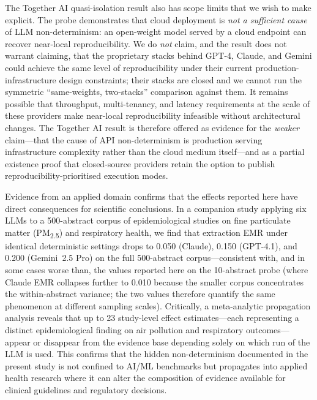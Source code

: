 \documentclass[sn-nature]{sn-jnl}
\begin{document}
The Together AI quasi-isolation result also has scope limits that we wish to make explicit.
The probe demonstrates that cloud deployment is \emph{not a sufficient cause} of LLM non-determinism: an open-weight model served by a cloud endpoint can recover near-local reproducibility.
We do \emph{not} claim, and the result does not warrant claiming, that the proprietary stacks behind GPT-4, Claude, and Gemini could achieve the same level of reproducibility under their current production-infrastructure design constraints; their stacks are closed and we cannot run the symmetric ``same-weights, two-stacks'' comparison against them.
It remains possible that throughput, multi-tenancy, and latency requirements at the scale of these providers make near-local reproducibility infeasible without architectural changes.
The Together AI result is therefore offered as evidence for the \emph{weaker} claim---that the cause of API non-determinism is production serving infrastructure complexity rather than the cloud medium itself---and as a partial existence proof that closed-source providers retain the option to publish reproducibility-prioritised execution modes.

Evidence from an applied domain confirms that the effects reported here have direct consequences for scientific conclusions.
In a companion study applying six LLMs to a 500-abstract corpus of epidemiological studies on fine particulate matter (PM\textsubscript{2.5}) and respiratory health\cite{rover2026evidence}, we find that extraction EMR under identical deterministic settings drops to 0.050 (Claude), 0.150 (GPT-4.1), and 0.200 (Gemini~2.5 Pro) on the full 500-abstract corpus---consistent with, and in some cases worse than, the values reported here on the 10-abstract probe (where Claude EMR collapses further to 0.010 because the smaller corpus concentrates the within-abstract variance; the two values therefore quantify the same phenomenon at different sampling scales).
Critically, a meta-analytic propagation analysis reveals that up to 23 study-level effect estimates---each representing a distinct epidemiological finding on air pollution and respiratory outcomes---appear or disappear from the evidence base depending solely on which run of the LLM is used.
This confirms that the hidden non-determinism documented in the present study is not confined to AI/ML benchmarks but propagates into applied health research where it can alter the composition of evidence available for clinical guidelines and regulatory decisions.
\end{document}
